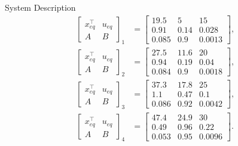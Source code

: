 \begin{slide}{System Description}
  \begin{equation}
    \begin{aligned}
      \label{eq:op-points}
      \left[\begin{array}{c|c}
          x_{eq}^{\top} & u_{eq} \\
          \hline
          A             & B
        \end{array}\right]_{1} & = \left[\begin{array}{cc|c}
          19.5  & 5    & 15     \\
          \hline
          0.91  & 0.14 & 0.028  \\
          0.085 & 0.9  & 0.0013
        \end{array}\right], \\
      \left[\begin{array}{c|c}
          x_{eq}^{\top} & u_{eq} \\
          \hline
          A             & B
        \end{array}\right]_{2} & = \left[\begin{array}{cc|c}
          27.5  & 11.6 & 20     \\
          \hline
          0.94  & 0.19 & 0.04   \\
          0.084 & 0.9  & 0.0018
        \end{array}\right], \\
      \left[\begin{array}{c|c}
          x_{eq}^{\top} & u_{eq} \\
          \hline
          A             & B
        \end{array}\right]_{3} & = \left[\begin{array}{cc|c}
          37.3  & 17.8 & 25     \\
          \hline
          1.1   & 0.47 & 0.1    \\
          0.086 & 0.92 & 0.0042
        \end{array}\right], \\
      \left[\begin{array}{c|c}
          x_{eq}^{\top} & u_{eq} \\
          \hline
          A             & B
        \end{array}\right]_{4} & = \left[\begin{array}{cc|c}
          47.4  & 24.9 & 30     \\
          \hline
          0.49  & 0.96 & 0.22   \\
          0.053 & 0.95 & 0.0096
        \end{array}\right].
    \end{aligned}
  \end{equation}
\end{slide}

